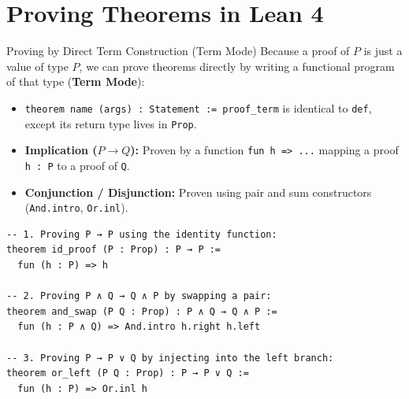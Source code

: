 \documentclass[aspectratio=169, 10pt]{beamer}
\begin{document}
\section{Proving Theorems in Lean 4}

\begin{frame}[fragile]{Proving by Direct Term Construction (Term Mode)}
  Because a proof of $P$ is just a value of type $P$, we can prove theorems directly by writing a functional program of that type (\textbf{Term Mode}):
  \begin{itemize}
    \item \texttt{theorem name (args) : Statement := proof\_term} is identical to \texttt{def}, except its return type lives in \texttt{Prop}.
    \item \textbf{Implication ($P \to Q$):} Proven by a function \texttt{fun h => ...} mapping a proof \texttt{h : P} to a proof of \texttt{Q}.
    \item \textbf{Conjunction / Disjunction:} Proven using pair and sum constructors (\texttt{And.intro}, \texttt{Or.inl}).
  \end{itemize}

  \vspace{0.1cm}
\begin{lstlisting}[language=Lean4]
-- 1. Proving P → P using the identity function:
theorem id_proof (P : Prop) : P → P :=
  fun (h : P) => h

-- 2. Proving P ∧ Q → Q ∧ P by swapping a pair:
theorem and_swap (P Q : Prop) : P ∧ Q → Q ∧ P :=
  fun (h : P ∧ Q) => And.intro h.right h.left

-- 3. Proving P → P ∨ Q by injecting into the left branch:
theorem or_left (P Q : Prop) : P → P ∨ Q :=
  fun (h : P) => Or.inl h
\end{lstlisting}
\end{frame}
\end{document}
